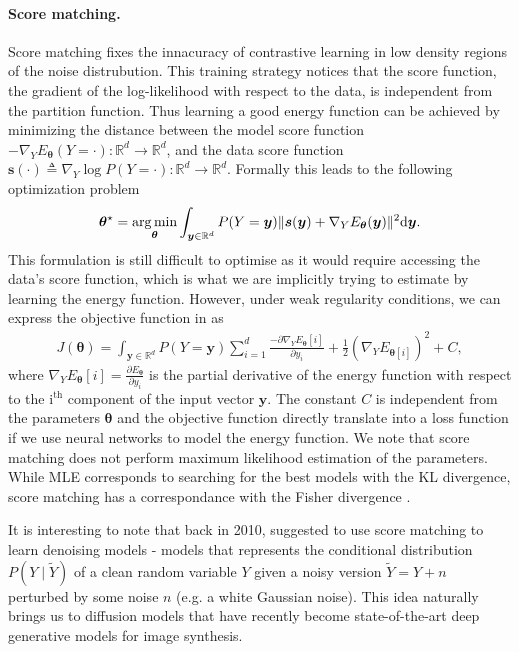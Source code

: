\paragraph{Score matching.}
Score matching \citep{hyvarinen2005estimation} fixes the innacuracy of contrastive learning in low density regions of the noise distrubution. This training strategy notices that the score function, the gradient of the log-likelihood with respect to the data, is independent from the partition function. Thus learning a good energy function can be achieved by minimizing the distance between the model score function $-\nabla_Y E_{\bm{\theta}}(Y=\cdot): \mathbb{R}^d \rightarrow \mathbb{R}^d$, and the data score function $\bm{s}(\cdot)\triangleq \nabla_Y \log P(Y=\cdot): \mathbb{R}^d \rightarrow \mathbb{R}^d$. Formally this leads to the following optimization problem
\begin{align}
  \bm{\theta}^{\star} = \operatorname*{arg\,min}_{\bm{\theta}} \int_{\bm{y} \in \mathbb{R}^d} P(Y=\bm{y}) \lVert \bm{s}(\bm{y}) + \nabla_Y E_{\bm{\theta}}(\bm{y})\rVert^2 \text{d}\bm{y}. \label{eq:score_matching}
\end{align}
This formulation is still difficult to optimise as it would require accessing the data's score function, which is what we are implicitly trying to estimate by learning the energy function. However, under weak regularity conditions, we can express the objective function in  as
\begin{align}
  J(\bm{\theta}) = \int_{\bm{y} \in \mathbb{R}^d} P(Y=\bm{y}) \sum_{i=1}^d \frac{-\partial \nabla_Y E_{\bm{\theta}}[i]}{\partial y_i } + \frac{1}{2} (\nabla_Y E_{\bm{\theta}[i]})^2 + C,
\end{align}
where $\nabla_Y E_{\bm{\theta}}[i] = \frac{\partial E_{\bm{\theta}}}{\partial y_i}$ is the partial derivative of the energy function with respect to the $\text{i}^{\text{th}}$ component of the input vector $\bm y$. The constant $C$ is independent from the parameters $\bm \theta$ and the objective function directly translate into a loss function if we use neural networks to model the energy function. We note that score matching does not perform maximum likelihood estimation of the parameters. While MLE corresponds to searching for the best models with the KL divergence, score matching has a correspondance with the Fisher divergence \citep{lyu2012interpretation}.

It is interesting to note that back in 2010, \citet{vincent2011connection} suggested to use score matching to learn denoising models - models that represents the conditional distribution $P(Y\mid \tilde Y)$ of a clean random variable $Y$ given a noisy version $\tilde{Y} = Y + n$ perturbed by some noise $n$ (e.g. a white Gaussian noise). This idea naturally brings us to diffusion models that have recently become state-of-the-art deep generative models for image synthesis.
